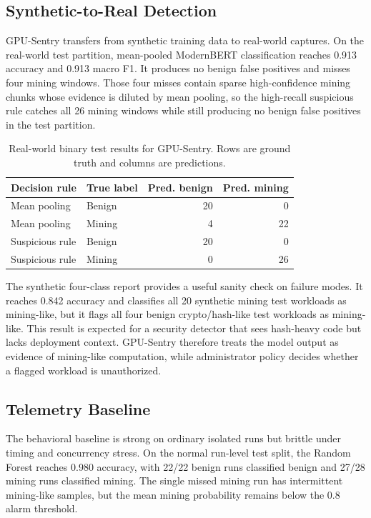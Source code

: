 \subsection{Synthetic-to-Real Detection}

GPU-Sentry transfers from synthetic training data to real-world captures. On the real-world test partition, mean-pooled ModernBERT classification reaches 0.913 accuracy and 0.913 macro F1. It produces no benign false positives and misses four mining windows. Those four misses contain sparse high-confidence mining chunks whose evidence is diluted by mean pooling, so the high-recall suspicious rule catches all 26 mining windows while still producing no benign false positives in the test partition.

\begin{table}[t]
    \centering
    \caption{Real-world binary test results for GPU-Sentry. Rows are ground truth and columns are predictions.}
    \label{tab:realworld_detection}
    \footnotesize
    \begin{tabular}{llrr}
        \toprule
        Decision rule & True label & Pred. benign & Pred. mining \\
        \midrule
        Mean pooling & Benign & 20 & 0 \\
        Mean pooling & Mining & 4 & 22 \\
        \midrule
        Suspicious rule & Benign & 20 & 0 \\
        Suspicious rule & Mining & 0 & 26 \\
        \bottomrule
    \end{tabular}
\end{table}

The synthetic four-class report provides a useful sanity check on failure modes. It reaches 0.842 accuracy and classifies all 20 synthetic mining test workloads as mining-like, but it flags all four benign crypto/hash-like test workloads as mining-like. This result is expected for a security detector that sees hash-heavy code but lacks deployment context. GPU-Sentry therefore treats the model output as evidence of mining-like computation, while administrator policy decides whether a flagged workload is unauthorized.

\subsection{Telemetry Baseline}

The behavioral baseline is strong on ordinary isolated runs but brittle under timing and concurrency stress. On the normal run-level test split, the Random Forest reaches 0.980 accuracy, with 22/22 benign runs classified benign and 27/28 mining runs classified mining. The single missed mining run has intermittent mining-like samples, but the mean mining probability remains below the 0.8 alarm threshold.

